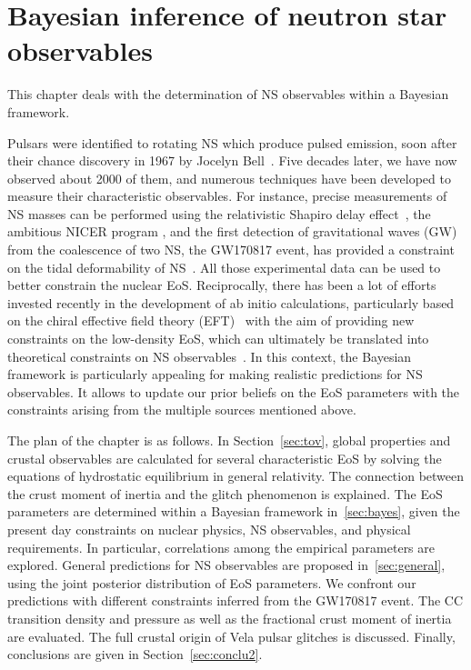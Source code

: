 %

\chapter{Bayesian inference of neutron star observables}

This chapter deals with the determination of NS observables within a Bayesian 
framework.

Pulsars were identified to rotating NS which produce pulsed emission, soon 
after their chance discovery in 1967 by Jocelyn Bell~\cite{Hewish1968}. Five
decades later, we have now observed about 2000 of them, and numerous techniques
have been developed to measure their characteristic observables. For instance, 
precise measurements of NS masses can be performed using the relativistic 
Shapiro delay effect~\cite{Demorest2010,Antoniadis2013,Cromartie2020}, the
ambitious NICER program , and 
the first detection of gravitational waves
(GW) from the coalescence of two NS, the GW170817 event, has provided a
constraint on the tidal deformability of NS~\cite{GWtidal,GW1,GW2}. All those
experimental data can be used to better constrain the nuclear EoS. 
Reciprocally, there has been a lot of efforts invested recently in the 
development of ab initio calculations, particularly based on the chiral 
effective field theory (EFT)~\cite{Drischler2016} with the aim of providing new 
constraints on the low-density EoS, which can
ultimately be translated into theoretical constraints on NS
observables~\cite{Carreau2019cc,Carreau2019moi}.
In this context, the Bayesian framework is particularly appealing for making 
realistic predictions for NS observables. It allows to update our prior beliefs 
on the EoS parameters with the constraints arising from the multiple sources 
mentioned above.

The plan of the chapter is as follows. In Section~\ref{sec:tov}, global
properties and crustal observables are calculated for several characteristic 
EoS by solving the equations of hydrostatic equilibrium in general relativity.
The connection between the crust moment of inertia and the glitch phenomenon is
explained. The EoS parameters are determined within a 
Bayesian framework in~\ref{sec:bayes}, given the present day constraints on
nuclear physics, NS observables, and physical requirements. In particular,
correlations among the empirical parameters are explored. General predictions
for NS observables are proposed in~\ref{sec:general}, using the joint posterior
distribution of EoS parameters. We confront our predictions with different 
constraints inferred from the GW170817 event. The CC transition density and
pressure as well as the fractional crust moment of inertia are evaluated. The
full crustal origin of Vela pulsar glitches is discussed. Finally, conclusions 
are given in Section~\ref{sec:conclu2}.

